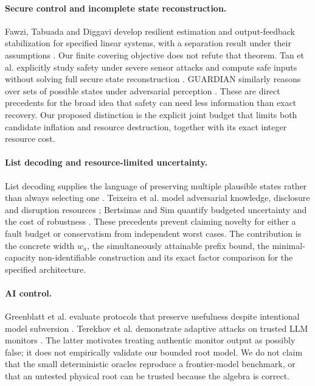 \paragraph{Secure control and incomplete state reconstruction.}
Fawzi, Tabuada and Diggavi develop resilient estimation and output-feedback stabilization for specified linear systems, with a separation result under their assumptions \cite{fawzi}. Our finite covering objective does not refute that theorem. Tan et al. explicitly study safety under severe sensor attacks and compute safe inputs without solving full secure state reconstruction \cite{tan24,tan25}. GUARDIAN similarly reasons over sets of possible states under adversarial perception \cite{guardian}. These are direct precedents for the broad idea that safety can need less information than exact recovery. Our proposed distinction is the explicit joint budget that limits both candidate inflation and resource destruction, together with its exact integer resource cost.

\paragraph{List decoding and resource-limited uncertainty.}
List decoding supplies the language of preserving multiple plausible states rather than always selecting one \cite{guruswami}. Teixeira et al. model adversarial knowledge, disclosure and disruption resources \cite{teixeira}; Bertsimas and Sim quantify budgeted uncertainty and the cost of robustness \cite{bertsimas}. These precedents prevent claiming novelty for either a fault budget or conservatism from independent worst cases. The contribution is the concrete width $w_a$, the simultaneously attainable prefix bound, the minimal-capacity non-identifiable construction and its exact factor comparison for the specified architecture.

\paragraph{AI control.}
Greenblatt et al. evaluate protocols that preserve usefulness despite intentional model subversion \cite{greenblatt}. Terekhov et al. demonstrate adaptive attacks on trusted LLM monitors \cite{terekhov}. The latter motivates treating authentic monitor output as possibly false; it does not empirically validate our bounded root model. We do not claim that the small deterministic oracles reproduce a frontier-model benchmark, or that an untested physical root can be trusted because the algebra is correct.

